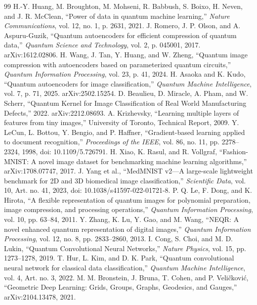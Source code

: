 \documentclass[sn-mathphys,Numbered]{sn-jnl}
\begin{document}
\begin{thebibliography}{99}
 H.-Y. Huang, M. Broughton, M. Mohseni, R. Babbush, S. Boixo, H. Neven, and J. R. McClean, ``Power of data in quantum machine learning,'' \textit{Nature Communications}, vol. 12, no. 1, p. 2631, 2021.
 J. Romero, J. P. Olson, and A. Aspuru-Guzik, ``Quantum autoencoders for efficient compression of quantum data,'' \textit{Quantum Science and Technology}, vol. 2, p. 045001, 2017. arXiv:1612.02806.
 H. Wang, J. Tan, Y. Huang, and W. Zheng, ``Quantum image compression with autoencoders based on parameterized quantum circuits,'' \textit{Quantum Information Processing}, vol. 23, p. 41, 2024.
 H. Asaoka and K. Kudo, ``Quantum autoencoders for image classification,'' \textit{Quantum Machine Intelligence}, vol. 7, p. 71, 2025. arXiv:2502.15254.
 D. Beaulieu, D. Miracle, A. Pham, and W. Scherr, ``Quantum Kernel for Image Classification of Real World Manufacturing Defects,'' 2022. arXiv:2212.08693.
 A. Krizhevsky, ``Learning multiple layers of features from tiny images,'' University of Toronto, Technical Report, 2009.
 Y. LeCun, L. Bottou, Y. Bengio, and P. Haffner, ``Gradient-based learning applied to document recognition,'' \textit{Proceedings of the IEEE}, vol. 86, no. 11, pp. 2278--2324, 1998, doi: 10.1109/5.726791.
 H. Xiao, K. Rasul, and R. Vollgraf, ``Fashion-MNIST: A novel image dataset for benchmarking machine learning algorithms,'' arXiv:1708.07747, 2017.
 J. Yang et al., ``MedMNIST v2---A large-scale lightweight benchmark for 2D and 3D biomedical image classification,'' \textit{Scientific Data}, vol. 10, Art. no. 41, 2023, doi: 10.1038/s41597-022-01721-8.
 P. Q. Le, F. Dong, and K. Hirota, ``A flexible representation of quantum images for polynomial preparation, image compression, and processing operations,'' \textit{Quantum Information Processing}, vol. 10, pp. 63--84, 2011.
 Y. Zhang, K. Lu, Y. Gao, and M. Wang, ``NEQR: A novel enhanced quantum representation of digital images,'' \textit{Quantum Information Processing}, vol. 12, no. 8, pp. 2833--2860, 2013.
 I. Cong, S. Choi, and M. D. Lukin, ``Quantum Convolutional Neural Networks,'' \textit{Nature Physics}, vol. 15, pp. 1273--1278, 2019.
 T. Hur, L. Kim, and D. K. Park, ``Quantum convolutional neural network for classical data classification,'' \textit{Quantum Machine Intelligence}, vol. 4, Art. no. 3, 2022.
 M. M. Bronstein, J. Bruna, T. Cohen, and P. Veli\v{c}kovi\'c, ``Geometric Deep Learning: Grids, Groups, Graphs, Geodesics, and Gauges,'' arXiv:2104.13478, 2021.

\end{thebibliography}
\end{document}
